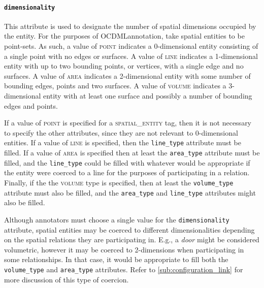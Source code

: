 \documentclass[11pt]{article}
\newcommand{\ML}{OCDML}
\newenvironment{note}
{\list{}
 {\setlength
  {\itemindent}
  {\listparindent}}
   \item[\textbf{Note:}]\relax}
{\endlist}
\begin{document}
\paragraph{\texttt{dimensionality}} %
\label{par:dimensionality}
This attribute is used to designate the number of spatial dimensions occupied by the entity. For the purposes of \ML annotation, take spatial entities to be point-sets. As such, a value of \textsc{point} indicates a 0-dimensional entity consisting of a single point with no edges or surfaces. A value of \textsc{line} indicates a 1-dimensional entity with up to two bounding points, or vertices, with a single edge and no surfaces. A value of \textsc{area} indicates a 2-dimensional entity with some number of bounding edges, points and two surfaces. A value of \textsc{volume} indicates a 3-dimensional entity with at least one surface and possibly a number of bounding edges and points.

If a value of \textsc{point} is specified for a \textsc{spatial\_entity} tag, then it is not necessary to specify the other attributes, since they are not relevant to 0-dimensional entities. If a value of \textsc{line} is specified, then the \texttt{line\_type} attribute must be filled. If a value of \textsc{area} is specified then at least the \texttt{area\_type} attribute must be filled, and the \texttt{line\_type} could be filled with whatever would be appropriate if the entity were coerced to a line for the purposes of participating in a relation. Finally, if the the \textsc{volume} type is specified, then at least the \texttt{volume\_type} attribute must also be filled, and the \texttt{area\_type} and \texttt{line\_type} attributes might also be filled.

\begin{note}
Although annotators must choose a single value for the \texttt{dimensionality} attribute, spatial entities may be coerced to different dimensionalities depending on the spatial relations they are participating in. E.g., a \emph{door} might be considered volumetric, however it may be coerced to 2-dimensions when participating in some relationships. In that case, it would be appropriate to fill both the \texttt{volume\_type} and \texttt{area\_type} attributes. Refer to \cref{sub:configuration_link} for more discussion of this type of coercion.
\end{note}

\end{document}
